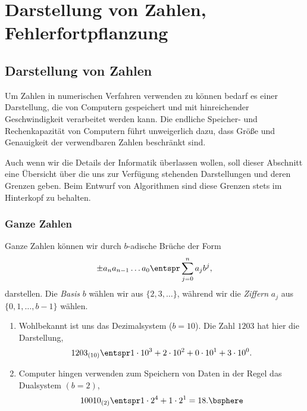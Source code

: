\section{Darstellung von Zahlen, Fehlerfortpflanzung}

\subsection{Darstellung von Zahlen}

Um Zahlen in numerischen Verfahren verwenden zu können bedarf es einer
Darstellung, die von Computern gespeichert und mit hinreichender
Geschwindigkeit verarbeitet werden kann. Die endliche Speicher- und
Rechenkapazität von Computern führt unweigerlich dazu, dass Größe und
Genauigkeit der verwendbaren Zahlen beschränkt sind.

Auch wenn wir die Details der Informatik überlassen wollen, soll dieser
Abschnitt eine Übersicht über die uns zur Verfügung stehenden Darstellungen und
deren Grenzen geben. Beim Entwurf von Algorithmen sind diese Grenzen stets im
Hinterkopf zu behalten.

\subsubsection{Ganze Zahlen}

Ganze Zahlen können wir durch $b$-adische Brüche der Form
\begin{align*}
\pm a_n a_{n-1} \ldots a_0 \entspr \sum\limits_{j=0}^n a_j b^j,
\end{align*}
darstellen.  Die \emph{Basis} $b$ wählen wir aus $\{2,3,\ldots\}$, während
wir die \emph{Ziffern} $a_j$ aus $\{0,1,\ldots,b-1\}$ wählen.

\begin{bspn}
\begin{enumerate}[label=(\roman{*})]
  \item Wohlbekannt ist uns das Dezimalsystem ($b=10$). Die Zahl $1203$ hat
  hier die Darstellung,
\begin{align*}
1203_{(10)} \entspr 1\cdot 10^3 + 2\cdot 10^2 + 0\cdot 10^1 + 3\cdot 10^0.
\end{align*}
\item Computer hingen verwenden zum Speichern von Daten in der Regel das
Dualsystem $(b=2)$,
\begin{align*}
10010_{(2)} \entspr 1\cdot 2^4 + 1\cdot 2^1 = 18.\bsphere
\end{align*}
\end{enumerate}
\end{bspn}

